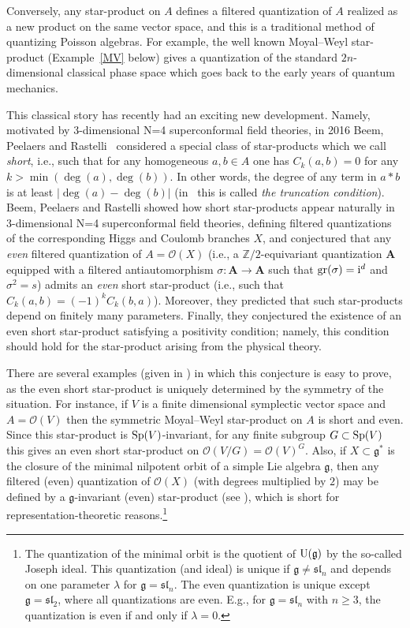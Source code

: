 \documentclass[pdftex]{sigma}
\numberwithin{equation}{section}
\newcommand{\g}{\mathfrak{g}}
\begin{document}
Conversely, any star-product on $A$ defines a filtered quantization of $A$ realized as a new product on the same vector space, and this is a traditional method of quantizing Poisson algebras. For example, the well known Moyal--Weyl star-product (Example~\ref{MV} below) gives a quantization of the standard $2n$-dimensional classical phase space which goes back to the early years of quantum mechanics.

This classical story has recently had an exciting new development. Namely, motivated by 3-dimensional N=4 superconformal field theories, in 2016 Beem, Peelaers and Rastelli~\cite{BPR} considered a special class of star-products which we call {\it short}, i.e., such that for any homogeneous $a,b\in A$ one has $C_k(a,b)=0$ for any $k>\min(\deg(a),\deg(b))$. In other words, the degree of any term in $a*b$ is at least $|\deg(a)-\deg(b)|$ (in~\cite{BPR} this is called {\it the truncation condition}). Beem, Peelaers and Rastelli showed how short star-products appear naturally in 3-dimensional N=4 superconformal field theories, defining filtered quantizations of the corresponding Higgs and Coulomb branches $X$, and conjectured that any {\it even} filtered quantization of $A={\mathcal O}(X)$ (i.e., a ${\mathbb Z}/2$-equivariant quantization ${{\mathbf A}}$ equipped with a filtered antiautomorphism $\sigma\colon {{\mathbf A}}\to {{\mathbf A}}$ such that $\operatorname{gr}(\sigma)={\rm i}^d$ and $\sigma^2=s$) admits an {\it even} short star-product (i.e., such that $C_k(a,b)=(-1)^kC_k(b,a)$). Moreover, they predicted that such star-products depend on finitely many parameters. Finally, they conjectured the existence of an even short star-product satisfying a positivity condition; namely, this condition should hold for the star-product arising from the physical theory.

There are several examples (given in \cite{BPR}) in which this conjecture is easy to prove, as the even short star-product is uniquely determined by the symmetry of the situation. For instance, if $V$ is a finite dimensional symplectic vector space and $A=\mathcal{O}(V)$ then the symmetric Moyal--Weyl star-product on $A$ is short and even. Since this star-product is ${\rm Sp}(V)$-invariant, for any finite subgroup $G\subset {\rm Sp}(V)$ this gives an even short star-product on ${\mathcal O}(V/G)=\mathcal{O}(V)^G$. Also, if $X\subset \mathfrak g^*$ is the closure of the minimal nilpotent orbit of a simple Lie algebra $\mathfrak g$, then any filtered (even) quantization of $\mathcal{O}(X)$ (with degrees multiplied by $2$) may be defined by a $\g$-invariant (even) star-product (see \cite{L1}), which is short for representation-theoretic reasons.\footnote{The quantization of the minimal orbit is the quotient of ${\rm U}(\g)$ by the so-called Joseph ideal. This quantization (and ideal) is unique if $\g\ne \mathfrak{sl}_n$ and depends on one parameter $\lambda$ for $\g= \mathfrak{sl}_n$. The even quantization is unique except $\g=\mathfrak{sl}_2$, where all quantizations are even. E.g., for $\g=\mathfrak{sl}_n$ with $n\ge 3$, the quantization is even if and only if $\lambda=0$.}
\end{document}
